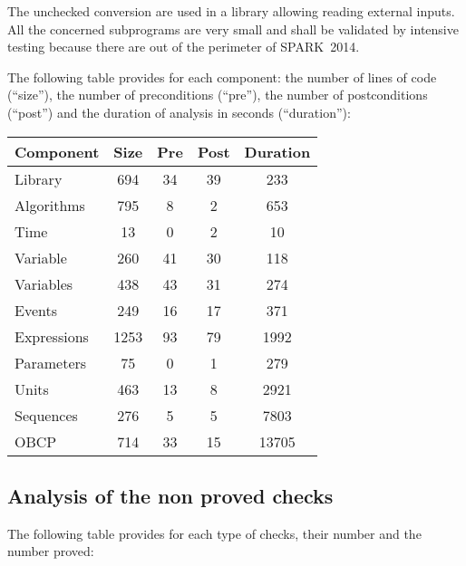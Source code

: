 \documentclass[10pt,a4paper,twocolumn]{article}
\newcommand{\newspark}{SPARK~2014\xspace}
\begin{document}
The unchecked conversion are used in a library allowing reading external inputs.
All the concerned subprograms are very small and shall be validated by intensive testing because there are out of the perimeter of \newspark.

\vspace{5mm}

The following table provides for each component: the number of lines of code (``size''), the number of preconditions (``pre''), the number of postconditions (``post'') and the duration of analysis in seconds (``duration''):

\vspace{5mm}

\begin{tabular}{|l|c|c|c|c|}
\hline
Component   & Size & Pre & Post & Duration \\
\hline
Library     &  694 &  34 &   39 &   233 \\
\hline
Algorithms  &  795 &   8 &    2 &   653 \\
\hline
Time        &   13 &   0 &    2 &    10 \\
\hline
Variable    &  260 &  41 &   30 &   118 \\
\hline
Variables   &  438 &  43 &   31 &   274 \\
\hline
Events      &  249 &  16 &   17 &   371 \\
\hline
Expressions & 1253 &  93 &   79 &  1992 \\
\hline
Parameters  &   75 &   0 &    1 &   279 \\
\hline
Units       &  463 &  13 &    8 &  2921 \\
\hline
Sequences   &  276 &   5 &    5 &  7803 \\
\hline
OBCP        &  714 &  33 &   15 & 13705 \\
\hline
\end{tabular}

\subsection{Analysis of the non proved checks}

The following table provides for each type of checks, their number and the number proved:

\vspace{5mm}
\end{document}
